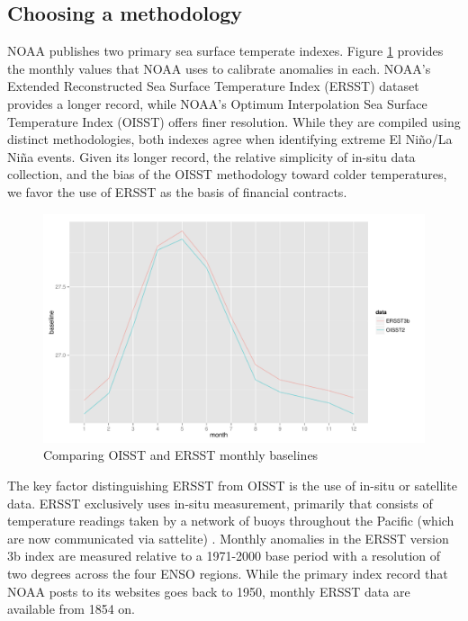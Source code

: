 \documentclass[authoryear]{article}
\begin{document}
\subsection{Choosing a methodology}
NOAA publishes two primary sea surface temperate indexes. Figure \ref{fig:baeslinesOIER} provides the monthly values that NOAA uses to calibrate anomalies in each. NOAA's Extended Reconstructed Sea Surface Temperature Index (ERSST) dataset provides a longer record, while NOAA's Optimum Interpolation Sea Surface Temperature Index (OISST) offers finer resolution. While they are compiled using distinct methodologies, both indexes agree when identifying extreme El Ni\~no/La Ni\~na events. Given its longer record, the relative simplicity of in-situ data collection, and the bias of the OISST methodology toward colder temperatures, we favor the use of ERSST as the basis of financial contracts.

\begin{figure}[!htbp]
  \includegraphics[width=\linewidth]{Pricingfigs/CompareOISSTandERRSTbaselines}
  \caption{Comparing OISST and ERSST monthly baselines}
   \label{fig:baeslinesOIER}
\end{figure}

The key factor distinguishing ERSST from OISST is the use of in-situ or satellite data. ERSST exclusively uses in-situ measurement, primarily that consists of temperature readings taken by a network of buoys throughout the Pacific (which are now communicated via sattelite) \cite{smith2004improved}\cite{smith2003extended}\cite{smith2008improvements}. Monthly anomalies in the ERSST version 3b index are measured relative to a 1971-2000 base period with a resolution of two degrees across the four ENSO regions\cite{xue2003interdecadal}. While the primary index record that NOAA posts to its websites goes back to 1950, monthly ERSST data are available from 1854 on.
\end{document}
